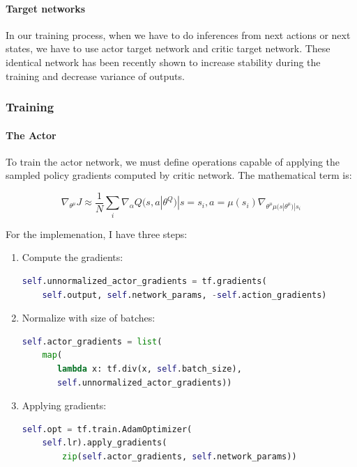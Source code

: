 \documentclass{article}
\begin{document}
\paragraph{Target networks}

In our training process, when we have to do inferences from next actions or next
states, we have to use actor target network and critic target network. These
identical network has been recently shown to increase stability during the
training and decrease variance of outputs.

\subsubsection{Training}

\paragraph{The Actor}

To train the actor network, we must define operations capable of applying the
sampled policy gradients computed by critic network. The mathematical term is:

\begin{equation}
\nabla_{\theta^{\mu}}J\approx\frac{1}{N}\sum_{i}\nabla_{\alpha}Q(s,a|\theta^{Q})|s=s_{i},a=\mu(s_{i})\nabla_{\theta^{\mu}\mu(s|\theta^{\mu})|s_{i}}
\end{equation}

For the implemenation, I have three steps:
\begin{enumerate}
  
\item Compute the gradients:
\begin{lstlisting}[language=Python]
self.unnormalized_actor_gradients = tf.gradients(
    self.output, self.network_params, -self.action_gradients)
\end{lstlisting}
  
\item Normalize with size of batches:
\begin{lstlisting}[language=Python]
self.actor_gradients = list(
    map(
       lambda x: tf.div(x, self.batch_size),
       self.unnormalized_actor_gradients))  
\end{lstlisting}
  
\item Applying gradients:
\begin{lstlisting}[language=Python]
self.opt = tf.train.AdamOptimizer(
    self.lr).apply_gradients(
        zip(self.actor_gradients, self.network_params))
\end{lstlisting}
\end{enumerate}
\end{document}
